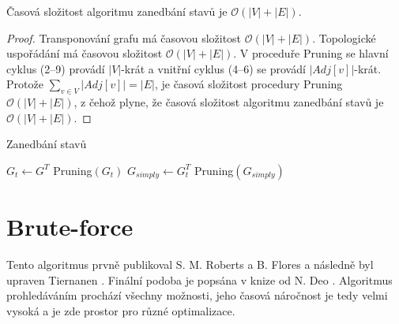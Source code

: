         \begin{theorem}
            Časová složitost algoritmu zanedbání stavů je $\mathcal{O}(|V| + |E|)$.
        \end{theorem}

        \begin{proof}
            Transponování grafu má časovou složitost $\mathcal{O}(|V| + |E|)$. Topologické uspořádání má časovou složitost $\mathcal{O}(|V| + |E|)$. V proceduře Pruning se hlavní cyklus (2--9) provádí $|V|$-krát a vnitřní cyklus (4--6) se provádí $|Adj[v]|$-krát. Protože $\sum_{v \in V}|Adj[v]| = |E|$, je časová složitost procedury Pruning $\mathcal{O}(|V| + |E|)$, z čehož plyne, že časová složitost algoritmu zanedbání stavů je $\mathcal{O}(|V| + |E|)$.
        \end{proof}

        \newpage

        \begin{algorithm}
            \label{algo:ZanedbaniStavu}
            \DontPrintSemicolon
            \caption{Zanedbání stavů}
            \vspace*{0.5em}

            \vspace*{0.5em}

            $G_t \leftarrow G^T$ 
            Pruning$(G_t)$ 
            $G_{simply} \leftarrow G_t^T$ 
            Pruning$(G_{simply})$ 
            \vspace*{0.5em}


        \end{algorithm}

\chapter{Brute-force}
    \label{chapter:Algo1}
    Tento algoritmus prvně publikoval S. M. Roberts a B. Flores a následně byl upraven Tiernanen \cite{Tiernan}. Finální podoba je popsána v knize od N. Deo \cite{Book_algo}. Algoritmus prohledáváním prochází všechny možnosti, jeho časová náročnost je tedy velmi vysoká a je zde prostor pro různé optimalizace.

